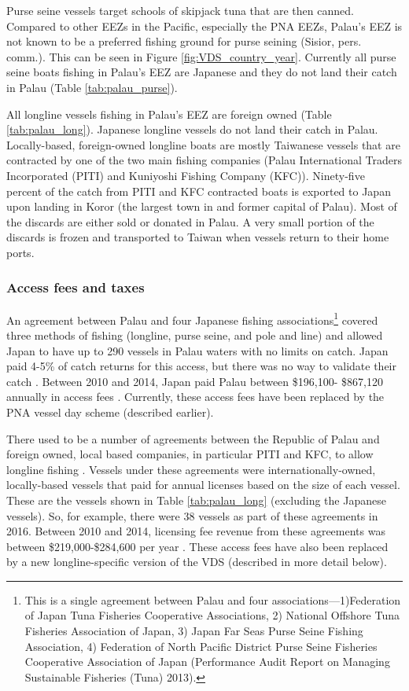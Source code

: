 \documentclass[9pttwoside,lineno]{pnas-new}
\begin{document}
Purse seine vessels target schools of skipjack tuna that are then canned. Compared to other EEZs in the Pacific, especially the PNA EEZs, Palau’s EEZ is not known to be a preferred fishing ground for purse seining (Sisior, pers. comm.). This can be seen in Figure \ref{fig:VDS_country_year}. Currently all purse seine boats fishing in Palau’s EEZ are Japanese and they do not land their catch in Palau (Table \ref{tab:palau_purse}). 



All longline vessels fishing in Palau’s EEZ are foreign owned (Table \ref{tab:palau_long}). Japanese longline vessels do not land their catch in Palau. Locally-based, foreign-owned longline boats are mostly Taiwanese vessels that are contracted by one of the two main fishing companies (Palau International Traders Incorporated (PITI) and Kuniyoshi Fishing Company (KFC)). Ninety-five percent of the catch from PITI and KFC contracted boats is exported to Japan upon landing in Koror (the largest town in and former capital of Palau). Most of the discards are either sold or donated in Palau. A very small portion of the discards is frozen and transported to Taiwan when vessels return to their home ports.




\subsubsection{Access fees and taxes}

An agreement between Palau and four Japanese fishing associations\footnote{This is a single agreement between Palau and four associations—1)Federation of Japan Tuna Fisheries Cooperative Associations, 2) National Offshore Tuna Fisheries Association of Japan, 3) Japan Far Seas Purse Seine Fishing Association, 4) Federation of North Pacific District Purse Seine Fisheries Cooperative Association of Japan (Performance Audit Report on Managing Sustainable Fisheries (Tuna) 2013).} covered three methods of fishing (longline, purse seine, and pole and line) and allowed Japan to have up to 290 vessels in Palau waters with no limits on catch. Japan paid 4-5\% of catch returns for this access, but there was no way to validate their catch \citep{Tewid2013}. Between 2010 and 2014, Japan paid Palau between \$196,100- \$867,120 annually in access fees \citep{Gillett2016}. Currently, these access fees have been replaced by the PNA vessel day scheme (described earlier).
 
There used to be a number of agreements between the Republic of Palau and foreign owned, local based companies, in particular PITI and KFC, to allow longline fishing \cite{Tewid2013}. Vessels under these agreements were internationally-owned, locally-based vessels that paid for annual licenses based on the size of each vessel. These are the vessels shown in Table \ref{tab:palau_long} (excluding the Japanese vessels). So, for example, there were 38 vessels as part of these agreements in 2016. Between 2010 and 2014, licensing fee revenue from these agreements was between \$219,000-\$284,600 per year \citep{Gillett2016}. These access fees have also been replaced by a new longline-specific version of the VDS (described in more detail below).
\end{document}
